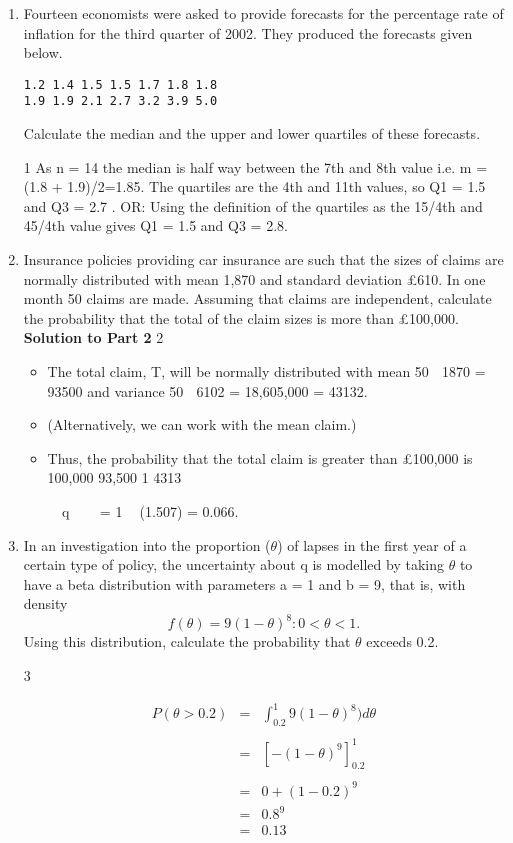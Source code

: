 \documentclass[a4paper,12pt]{article}
\begin{document}
\begin{enumerate}
\item  Fourteen economists were asked to provide forecasts for the percentage rate
of inflation for the third quarter of 2002. They produced the forecasts given
below.
\begin{verbatim}
1.2 1.4 1.5 1.5 1.7 1.8 1.8
1.9 1.9 2.1 2.7 3.2 3.9 5.0    
\end{verbatim}

Calculate the median and the upper and lower quartiles of these forecasts. 

1 As n = 14 the median is half way between the 7th and 8th value
i.e. m = (1.8 + 1.9)/2=1.85.
The quartiles are the 4th and 11th values, so Q1 = 1.5 and Q3 = 2.7 .
OR: Using the definition of the quartiles as the 15/4th and 45/4th value gives
Q1 = 1.5 and Q3 = 2.8.
\newpage
\item Insurance policies providing car insurance are such that the sizes of claims are
normally distributed with mean 1,870 and standard deviation £610. In one
month 50 claims are made. Assuming that claims are independent, calculate
the probability that the total of the claim sizes is more than £100,000. 
\noinden \textbf{Solution to Part 2}
2 
\begin{itemize}
    \item The total claim, T, will be normally distributed with mean 50  1870 = 93500
and variance 50  6102 = 18,605,000 = 43132.
\item (Alternatively, we can work with the mean claim.)
\item Thus, the probability that the total claim is greater than £100,000 is
100,000 93,500
1
4313
\end{itemize}
  
 q 
 
= 1  (1.507) = 0.066.
\newpage
\item  In an investigation into the proportion ($\theta$) of lapses in the first year of a
certain type of policy, the uncertainty about q is modelled by taking $\theta$ to have a
beta distribution with parameters a = 1 and b = 9, that is, with density
\[f(\theta) = 9(1 - \theta)^8 : 0 < \theta < 1.\]
Using this distribution, calculate the probability that $\theta$ exceeds 0.2. 


3

\begin{eqnarray*}
P(\theta > 0.2) &=& \int^{1}_{0.2} 9(1- \theta)^8) d \theta \\
& & \\
&=& \left[ -(1-\theta)^9  \right]^{1}_{0.2}\\
& & \\
&=& 0 + (1 - 0.2)^9 \\ 
&=& 0.8^9 \\
&=& 0.13\\
\end{eqnarray*}



\end{enumerate}
\end{document}
